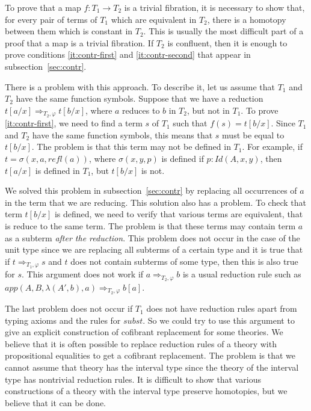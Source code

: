 \documentclass[reqno]{amsart}
\theoremstyle{definition}
\theoremstyle{remark}
\newcommand{\Id}{\mathit{Id}}
\newcommand{\app}{\mathit{app}}
\newcommand{\refl}{\mathit{refl}}
\newcommand{\subst}{\mathit{subst}}
\numberwithin{figure}{section}
\begin{document}
To prove that a map $f : T_1 \to T_2$ is a trivial fibration, it is necessary to show that, for every pair of terms of $T_1$ which are equivalent in $T_2$, there is a homotopy between them which is constant in $T_2$.
This is usually the most difficult part of a proof that a map is a trivial fibration.
If $T_2$ is confluent, then it is enough to prove conditions \eqref{it:contr-first} and \eqref{it:contr-second} that appear in subsection~\ref{sec:contr}.

There is a problem with this approach.
To describe it, let us assume that $T_1$ and $T_2$ have the same function symbols.
Suppose that we have a reduction $t[a/x] \Rightarrow_{T_2,\varphi} t[b/x]$, where $a$ reduces to $b$ in $T_2$, but not in $T_1$.
To prove \eqref{it:contr-first}, we need to find a term $s$ of $T_1$ such that $f(s) = t[b/x]$.
Since $T_1$ and $T_2$ have the same function symbols, this means that $s$ must be equal to $t[b/x]$.
The problem is that this term may not be defined in $T_1$.
For example, if $t = \sigma(x,a,\refl(a))$, where $\sigma(x,y,p)$ is defined if $p : \Id(A,x,y)$, then $t[a/x]$ is defined in $T_1$, but $t[b/x]$ is not.

We solved this problem in subsection~\ref{sec:contr} by replacing all occurrences of $a$ in the term that we are reducing.
This solution also has a problem.
To check that term $t[b/x]$ is defined, we need to verify that various terms are equivalent, that is reduce to the same term.
The problem is that these terms may contain term $a$ as a subterm \emph{after the reduction}.
This problem does not occur in the case of the unit type since we are replacing all subterms of a certain type
and it is true that if $t \Rightarrow_{T_1,\varphi} s$ and $t$ does not contain subterms of some type, then this is also true for $s$.
This argument does not work if $a \Rightarrow_{T_2,\varphi} b$ is a usual reduction rule such as $\app(A,B,\lambda(A',b),a) \Rightarrow_{T_2,\varphi} b[a]$.

The last problem does not occur if $T_1$ does not have reduction rules apart from typing axioms and the rules for $\subst$.
So we could try to use this argument to give an explicit construction of cofibrant replacement for some theories.
We believe that it is often possible to replace reduction rules of a theory with propositional equalities to get a cofibrant replacement.
The problem is that we cannot assume that theory has the interval type since the theory of the interval type has nontrivial reduction rules.
It is difficult to show that various constructions of a theory with the interval type preserve homotopies, but we believe that it can be done.
\end{document}
